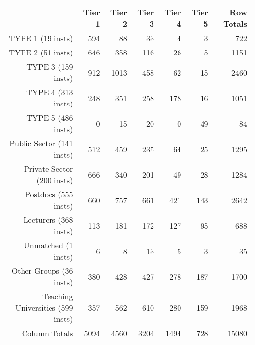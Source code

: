 \begin{tabular}{rrrrrrr}
  \hline
   & \textbf{Tier 1} & \textbf{Tier 2} & \textbf{Tier 3} & \textbf{Tier 4} & \textbf{Tier 5} & \textbf{Row Totals} \\\hline
  TYPE 1 (19 insts) & 594 & 88 & 33 & 4 & 3 & 722 \\
  TYPE 2 (51 insts) & 646 & 358 & 116 & 26 & 5 & 1151 \\
  TYPE 3 (159 insts) & 912 & 1013 & 458 & 62 & 15 & 2460 \\
  TYPE 4 (313 insts) & 248 & 351 & 258 & 178 & 16 & 1051 \\
  TYPE 5 (486 insts) & 0 & 15 & 20 & 0 & 49 & 84 \\
  Public Sector (141 insts) & 512 & 459 & 235 & 64 & 25 & 1295 \\
  Private Sector (200 insts) & 666 & 340 & 201 & 49 & 28 & 1284 \\
  Postdocs (555 insts) & 660 & 757 & 661 & 421 & 143 & 2642 \\
  Lecturers (368 insts) & 113 & 181 & 172 & 127 & 95 & 688 \\
  Unmatched (1 insts) & 6 & 8 & 13 & 5 & 3 & 35 \\
  Other Groups (36 insts) & 380 & 428 & 427 & 278 & 187 & 1700 \\
  Teaching Universities (599 insts) & 357 & 562 & 610 & 280 & 159 & 1968 \\
  Column Totals & 5094 & 4560 & 3204 & 1494 & 728 & 15080 \\\hline
\end{tabular}
